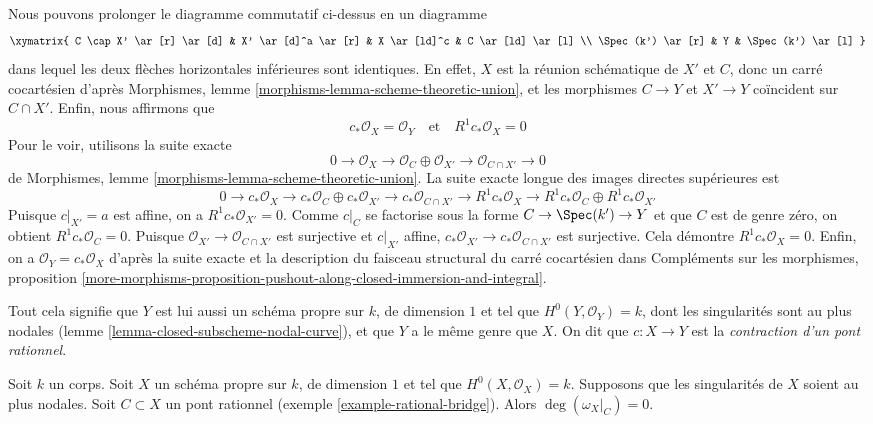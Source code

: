 \begin{example}
\medskip\noindent
Nous pouvons prolonger le diagramme commutatif ci-dessus en un diagramme $$
\xymatrix{
C \cap X' \ar[r] \ar[d] &
X' \ar[d]^a \ar[r] & X \ar[ld]^c &
C \ar[ld] \ar[l] \\
\Spec(k') \ar[r] &
Y &
\Spec(k') \ar[l]
}
$$ dans lequel les deux flèches horizontales inférieures sont identiques. En effet, $X$ est la réunion schématique de $X'$ et $C$, donc un carré cocartésien d'après Morphismes, lemme \ref{morphisms-lemma-scheme-theoretic-union}, et les morphismes $C \to Y$ et $X' \to Y$ coïncident sur $C \cap X'$. Enfin, nous affirmons que $$
c_*\mathcal{O}_X = \mathcal{O}_Y
\quad\text{et}\quad
R^1c_*\mathcal{O}_X = 0
$$ Pour le voir, utilisons la suite exacte $$
0 \to \mathcal{O}_X \to
\mathcal{O}_C \oplus \mathcal{O}_{X'} \to
\mathcal{O}_{C \cap X'} \to 0
$$ de Morphismes, lemme \ref{morphisms-lemma-scheme-theoretic-union}. La suite exacte longue des images directes supérieures est $$
0 \to c_*\mathcal{O}_X \to c_*\mathcal{O}_C \oplus c_*\mathcal{O}_{X'} \to
c_*\mathcal{O}_{C \cap X'} \to
R^1c_*\mathcal{O}_X \to
R^1c_*\mathcal{O}_C \oplus R^1c_*\mathcal{O}_{X'}
$$ Puisque $c|_{X'} = a$ est affine, on a $R^1c_*\mathcal{O}_{X'} = 0$. Comme $c|_C$ se factorise sous la forme $C \to \Spec(k') \to Y$ et que $C$ est de genre zéro, on obtient $R^1c_*\mathcal{O}_C = 0$. Puisque $\mathcal{O}_{X'} \to \mathcal{O}_{C \cap X'}$ est surjective et $c|_{X'}$ affine, $c_*\mathcal{O}_{X'} \to c_*\mathcal{O}_{C \cap X'}$ est surjective. Cela démontre $R^1c_*\mathcal{O}_X = 0$. Enfin, on a $\mathcal{O}_Y = c_*\mathcal{O}_X$ d'après la suite exacte et la description du faisceau structural du carré cocartésien dans Compléments sur les morphismes, proposition \ref{more-morphisms-proposition-pushout-along-closed-immersion-and-integral}.

\medskip\noindent
Tout cela signifie que $Y$ est lui aussi un schéma propre sur $k$, de dimension $1$ et tel que $H^0(Y, \mathcal{O}_Y) = k$, dont les singularités sont au plus nodales (lemme \ref{lemma-closed-subscheme-nodal-curve}), et que $Y$ a le même genre que $X$. On dit que $c : X \to Y$ est la {\it contraction d'un pont rationnel}.
\end{example}

\begin{lemma}
\label{lemma-rational-bridge-zero}
Soit $k$ un corps. Soit $X$ un schéma propre sur $k$, de dimension $1$ et tel que $H^0(X, \mathcal{O}_X) = k$. Supposons que les singularités de $X$ soient au plus nodales. Soit $C \subset X$ un pont rationnel (exemple \ref{example-rational-bridge}). Alors $\deg(\omega_X|_C) = 0$.
\end{lemma}

